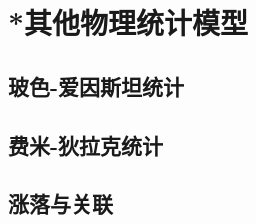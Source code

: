 

\section{*其他物理统计模型}\label{14-5}

\subsection{玻色-爱因斯坦统计}\label{14-5-1}

\subsection{费米-狄拉克统计}\label{14-5-2}

\subsection{涨落与关联}\label{14-5-3}
